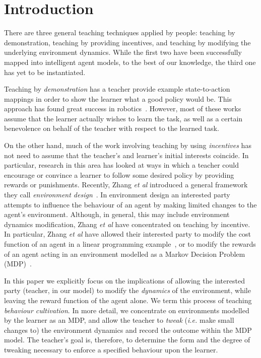 

\section{Introduction}

There are three general teaching techniques applied by people:  teaching by
demonstration, teaching  by  providing incentives,  and teaching by modifying the underlying environment dynamics.  While the
first two have been successfully mapped into intelligent agent models, to the best
of our knowledge, the third one has yet to be instantiated.

Teaching by {\em demonstration}  has a teacher provide  example state-to-action mappings in order  to show the learner what a good policy would be.  This approach  has  found great success in
robotics~\cite{argal_etal_2009}. However, most of these works assume
that the learner actually wishes to learn the task, as well as a
certain benevolence on behalf of the teacher with respect to the
learned task.

On the other hand, much of the work involving teaching by  using {\em incentives} 
has not need to assume that the teacher's and learner's initial interests coincide. 
In particular, research in this area has looked at ways in which a teacher could encourage or convince a learner to follow some desired policy by providing rewards or punishments.
 Recently, Zhang \emph{et al}
introduced a general framework they call \emph{environment
  design}~\cite{Zhang09:General}. In environment design an interested
party attempts to influence the behaviour of an agent by making limited
changes to the agent's environment. Although, in general, this may
include environment dynamics modification, Zhang \emph{et al} have
concentrated on teaching by incentive. In particular, Zhang \emph{et
  al} have allowed their interested party to modify the cost function
of an agent in a linear programming example~\cite{Zhang09:General}, or
to modify the rewards of an agent acting in an environment modelled as
a Markov Decision Problem (MDP)~\cite{zhang_parkes_2008,Zhang09:Policy}.

In this paper we explicitly focus on the  implications of allowing
the interested party (teacher, in our model) to modify the
\emph{dynamics} of the environment, while leaving the reward function
of the agent alone. We term this process of teaching {\em behaviour
  cultivation}. In more detail, we concentrate on environments
modelled by the learner as an MDP, and allow the teacher to \emph{tweak} (\emph{i.e.} make small changes to)  the
environment dynamics and record the outcome within the MDP model. 
The teacher's goal is, therefore, to determine the form and the degree of
tweaking necessary to enforce a specified behaviour upon the
learner. 


